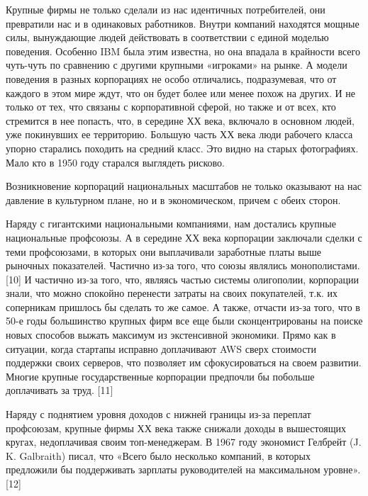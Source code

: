 \documentclass[ebook,12pt,oneside,openany]{memoir}
\begin{document}
Крупные фирмы не только сделали из нас идентичных потребителей, они
превратили нас и в одинаковых работников. Внутри компаний находятся
мощные силы, вынуждающие людей действовать в соответствии с единой
моделью поведения. Особенно IBM была этим известна, но она впадала в
крайности всего чуть-чуть по сравнению с другими крупными «игроками»
на рынке. А модели поведения в разных корпорациях не особо отличались,
подразумевая, что от каждого в этом мире ждут, что он будет более или
менее похож на других. И не только от тех, что связаны с корпоративной
сферой, но также и от всех, кто стремится в нее попасть, что, в
середине ХХ века, включало в основном людей, уже покинувших ее
территорию. Большую часть ХХ века люди рабочего класса упорно
старались походить на средний класс. Это видно на старых фотографиях.
Мало кто в 1950 году старался выглядеть рисково. \newline

Возникновение корпораций национальных масштабов не только оказывают на
нас давление в культурном плане, но и в экономическом, причем с обеих
сторон. \newline

Наряду с гигантскими национальными компаниями, нам достались крупные
национальные профсоюзы. А в середине ХХ века корпорации заключали
сделки с теми профсоюзами, в которых они выплачивали заработные платы
выше рыночных показателей. Частично из-за того, что союзы являлись
монополистами. [10] И частично из-за того, что, являясь частью системы
олигополии, корпорации знали, что можно спокойно перенести затраты на
своих покупателей, т.к. их соперникам пришлось бы сделать то же самое.
А также, отчасти из-за того, что в 50-е годы большинство крупных фирм
все еще были сконцентрированы на поиске новых способов выжать максимум
из экстенсивной экономики. Прямо как в ситуации, когда стартапы
исправно доплачивают AWS сверх стоимости поддержки своих серверов, что
позволяет им сфокусироваться на своем развитии. Многие крупные
государственные корпорации предпочли бы побольше доплачивать за труд.
[11] \newline

Наряду с поднятием уровня доходов с нижней границы из-за переплат
профсоюзам, крупные фирмы ХХ века также снижали доходы в вышестоящих
кругах, недоплачивая своим топ-менеджерам. В 1967 году экономист
Гелбрейт (J. K. Galbraith) писал, что «Всего было несколько компаний,
в которых предложили бы поддерживать зарплаты руководителей на
максимальном уровне». [12] \newline
\end{document}
